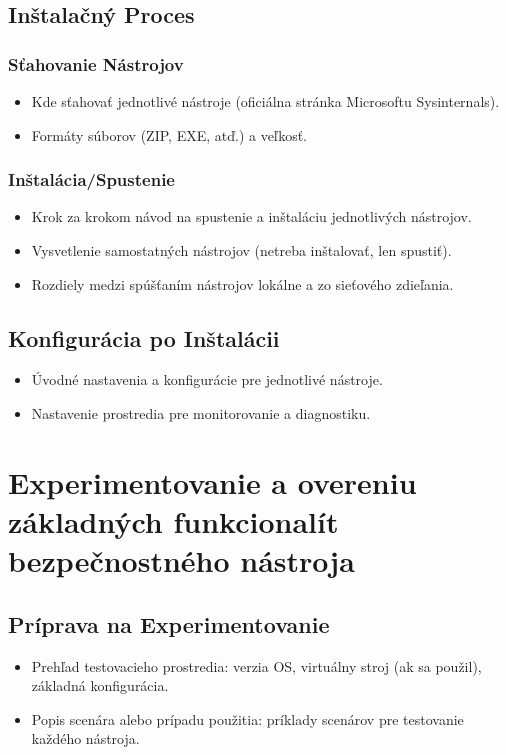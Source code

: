 \documentclass[conference]{IEEEtran}
\begin{document}
\subsection{Inštalačný Proces}
\subsubsection{Sťahovanie Nástrojov}
\begin{itemize}
    \item Kde sťahovať jednotlivé nástroje (oficiálna stránka Microsoftu Sysinternals).
    \item Formáty súborov (ZIP, EXE, atď.) a veľkosť.
\end{itemize}

\subsubsection{Inštalácia/Spustenie}
\begin{itemize}
    \item Krok za krokom návod na spustenie a inštaláciu jednotlivých nástrojov.
    \item Vysvetlenie samostatných nástrojov (netreba inštalovať, len spustiť).
    \item Rozdiely medzi spúšťaním nástrojov lokálne a zo sieťového zdieľania.
\end{itemize}

\subsection{Konfigurácia po Inštalácii}
\begin{itemize}
    \item Úvodné nastavenia a konfigurácie pre jednotlivé nástroje.
    \item Nastavenie prostredia pre monitorovanie a diagnostiku.
\end{itemize}

\section{Experimentovanie a overeniu základných funkcionalít bezpečnostného nástroja}
\subsection{Príprava na Experimentovanie}
\begin{itemize}
    \item Prehľad testovacieho prostredia: verzia OS, virtuálny stroj (ak sa použil), základná konfigurácia.
    \item Popis scenára alebo prípadu použitia: príklady scenárov pre testovanie každého nástroja.
\end{itemize}
\end{document}
